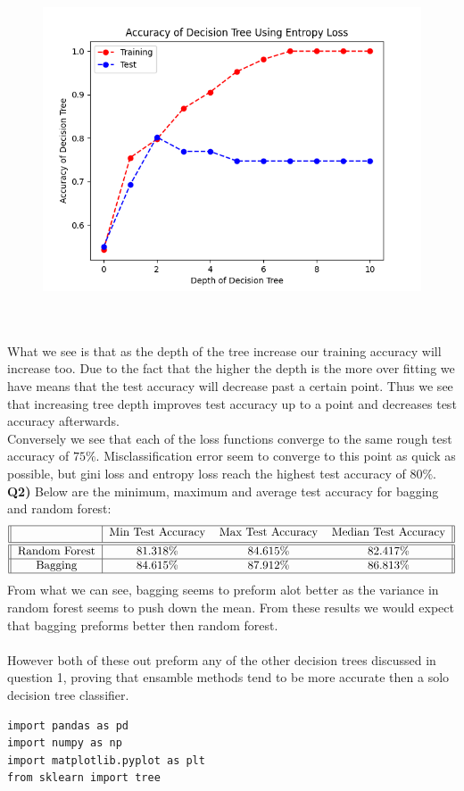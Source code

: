\documentclass{article}
\begin{document}
\begin{titlepage}
\begin{figure}[!htb]
    \centering
    \begin{minipage}{.5\textwidth}
        \centering
        \includegraphics[width=\textwidth]{g3.png}
    \end{minipage}%
\end{figure} \\\\
What we see is that as the depth of the tree increase our training accuracy will increase too. Due to the fact that the higher the depth is the more over fitting we have means that the test accuracy will decrease past a certain point. Thus we see that increasing tree depth improves test accuracy up to a point and decreases test accuracy afterwards. \\
Conversely we see that each of the loss functions converge to the same rough test accuracy of $75\%$. Misclassification error seem to converge to this point as quick as possible, but gini loss and entropy loss reach the highest test accuracy of $80\%$.
\newpage
\textbf{Q2)} Below are the minimum, maximum and average test accuracy for bagging and random forest:
\[
\begin{tabular}{||c | c c c||} 
 \hline
  & \text{Min Test Accuracy} & \text{Max Test Accuracy} & \text{Median Test Accuracy} \\ [0.5ex] 
 \hline\hline
 \text{Random Forest} & 81.318\% & 84.615\% & 82.417\% \\ 
 \hline
 \text{Bagging} & 84.615\% & 87.912\% & 86.813\% \\
 \hline
\end{tabular}
\]
From what we can see, bagging seems to preform alot better as the variance in random forest seems to push down the mean. From these results we would expect that bagging preforms better then random forest.\\\\
However both of these out preform any of the other decision trees discussed in question 1, proving that ensamble methods tend to be more accurate then a solo decision tree classifier.
\newpage
\begin{lstlisting}
import pandas as pd
import numpy as np
import matplotlib.pyplot as plt
from sklearn import tree


\end{lstlisting}
\end{titlepage}
\end{document}
